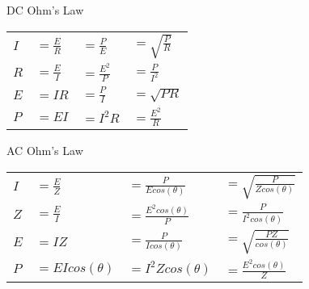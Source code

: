 %
%
%

\begin{section}{DC Ohm's Law}
  \renewcommand{\arraystretch}{1.5}
  \begin{tabular}{llll}
    $I$ & $=\frac{E}{R}$  & $=\frac{P}{E}$        & $=\sqrt{\frac{P}{R}}$  \\
    $R$ & $=\frac{E}{I}$  & $=\frac{E^2}{P}$      & $=\frac{P}{I^2}$ \\
    $E$ & $=IR$           & $=\frac{P}{I}$        & $=\sqrt{PR}$ \\
    $P$ & $=EI$           & $=I^2R$               & $=\frac{E^2}{R}$ \\
  \end{tabular}
\end{section}

\begin{section}{AC Ohm's Law}
  \renewcommand{\arraystretch}{1.5}
  \begin{tabular}{llll}
    $I$
    & $=\frac{E}{Z}$
    & $=\frac{P}{E cos(\theta)}$
    & $=\sqrt{\frac{P}{Z cos(\theta)}}$  \\
    $Z$
    & $=\frac{E}{I}$
    & $=\frac{E^2 cos(\theta)}{P}$
    & $=\frac{P}{I^2 cos(\theta)}$ \\
    $E$
    & $=IZ$
    & $=\frac{P}{I cos(\theta)}$
    & $=\sqrt{\frac{PZ}{cos(\theta)}}$ \\
    $P$
    & $=EI cos(\theta)$
    & $=I^2Z cos(\theta)$
    & $=\frac{E^2 cos(\theta)}{Z}$ \\
  \end{tabular}
\end{section}
